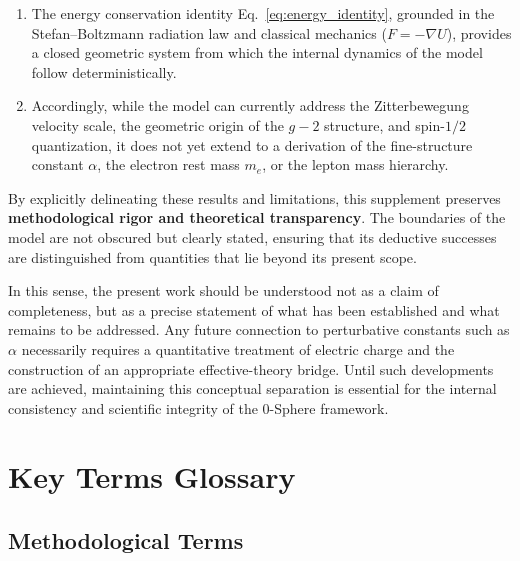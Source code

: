 \documentclass[12pt,letterpaper]{article}
\begin{document}
\begin{enumerate}
\item The energy conservation identity Eq.~\eqref{eq:energy_identity}, grounded in the Stefan--Boltzmann radiation law and classical mechanics ($F = -\nabla U$), provides a closed geometric system from which the internal dynamics of the model follow deterministically.

\item Accordingly, while the model can currently address the Zitterbewegung velocity scale, the geometric origin of the $g-2$ structure, and spin-$1/2$ quantization, it does not yet extend to a derivation of the fine-structure constant $\alpha$, the electron rest mass $m_e$, or the lepton mass hierarchy.
\end{enumerate}

By explicitly delineating these results and limitations, this supplement preserves \textbf{methodological rigor and theoretical transparency}. The boundaries of the model are not obscured but clearly stated, ensuring that its deductive successes are distinguished from quantities that lie beyond its present scope.

In this sense, the present work should be understood not as a claim of completeness, but as a precise statement of what has been established and what remains to be addressed. Any future connection to perturbative constants such as $\alpha$ necessarily requires a quantitative treatment of electric charge and the construction of an appropriate effective-theory bridge. Until such developments are achieved, maintaining this conceptual separation is essential for the internal consistency and scientific integrity of the 0-Sphere framework.


\section*{Key Terms Glossary}

\subsection*{Methodological Terms}
\end{document}
